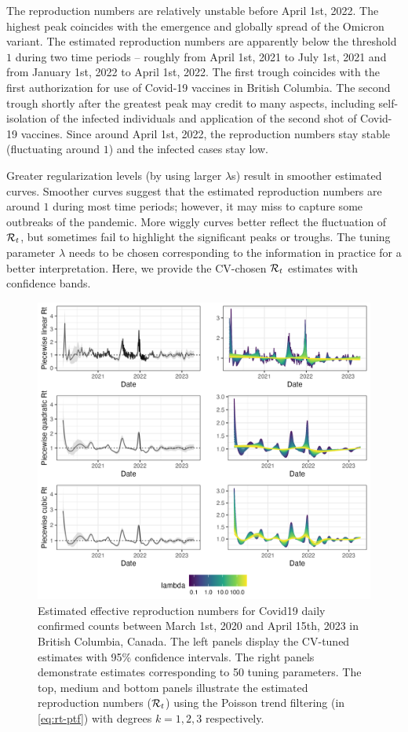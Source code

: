 The reproduction numbers are relatively unstable before April 1st, 2022. The highest peak coincides with the emergence and globally spread of the Omicron variant. The estimated reproduction numbers are apparently below the threshold $1$ during two time periods -- roughly from April 1st, 2021 to July 1st, 2021 and from January 1st, 2022 to April 1st, 2022. The first trough coincides with the first authorization for use of Covid-19 vaccines in British Columbia. The second trough shortly after the greatest peak may credit to many aspects, including self-isolation of the infected individuals and application of the second shot of Covid-19 vaccines. Since around April 1st, 2022, the reproduction numbers stay stable (fluctuating around $1$) and the infected cases stay low. 

Greater regularization levels (by using larger $\lambda$s) result in smoother estimated curves. Smoother curves suggest that the estimated reproduction numbers are around $1$ during most time periods; however, it may miss to capture some outbreaks of the pandemic. More wiggly curves better reflect the fluctuation of $\mathcal{R}_t$, but sometimes fail to highlight the significant peaks or troughs. The tuning parameter $\lambda$ needs to be chosen corresponding to the information in practice for a better interpretation. Here, we provide the CV-chosen $\mathcal{R}_t$ estimates with confidence bands. 
\begin{figure}[tb]
    \centering
    \includegraphics[width=0.99\linewidth]{fig/covid_full_res.png}
    \caption{Estimated effective reproduction numbers for Covid19 daily confirmed counts between March 1st, 2020 and April 15th, 2023 in British Columbia, Canada. The left panels display the CV-tuned estimates with 95\% confidence intervals. The right panels demonstrate estimates corresponding to 50 tuning parameters. The top, medium and bottom panels illustrate the estimated reproduction numbers ($\mathcal{R}_t$) using the Poisson trend filtering (in \eqref{eq:rt-ptf}) with degrees $k=1,2,3$ respectively.} 
    \label{fig:covid-rt}
\end{figure} 


